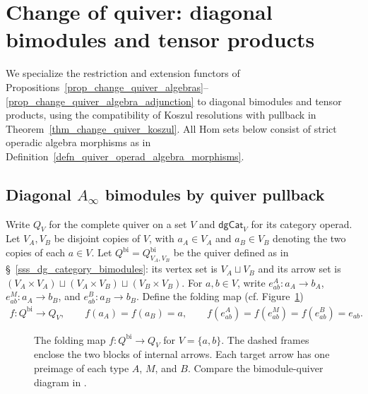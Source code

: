 \documentclass[11pt,letterpaper]{article}
\numberwithin{equation}{section}
\theoremstyle{plain}
\theoremstyle{definition}
\theoremstyle{remark}
\begin{document}
\section{Change of quiver: diagonal bimodules and tensor products}
\label{sss_diagonal_bimodule_pullback}
We specialize the restriction and extension functors of
Propositions~\ref{prop_change_quiver_algebras}--\ref{prop_change_quiver_algebra_adjunction}
to diagonal bimodules and tensor products, using the compatibility
of Koszul resolutions with pullback in
Theorem~\ref{thm_change_quiver_koszul}.
All Hom sets below consist of strict operadic algebra morphisms
as in Definition~\ref{defn_quiver_operad_algebra_morphisms}.

\subsection{Diagonal $A_\infty$ bimodules by quiver pullback}
\label{sss_diagonal_bimodule_construction}
Write $Q_V$ for the complete quiver on a set $V$ and
$\mathsf{dgCat}_V$ for its category operad. Let $V_A,V_B$ be
disjoint copies of $V$, with $a_A\in V_A$ and $a_B\in V_B$
denoting the two copies of each $a\in V$.
Let $Q^{\mathrm{bi}}=Q^{\mathrm{bi}}_{V_A,V_B}$ be the quiver
defined as in \S~\ref{sss_dg_category_bimodules}: its vertex
set is $V_A\sqcup V_B$ and its arrow set is
$(V_A\times V_A)\sqcup(V_A\times V_B)\sqcup(V_B\times V_B)$.
For $a,b\in V$, write
$ e^A_{ab}:a_A\to b_A$, $
 e^M_{ab}:a_A\to b_B$, and $
 e^B_{ab}:a_B\to b_B$.
Define the folding map (cf. Figure~\ref{fig:diagonal-quiver-folding})
\begin{equation}\label{eq_diagonal_quiver_folding}
\begin{gathered}
 f:Q^{\mathrm{bi}}\longrightarrow Q_V,
 \qquad f(a_A)=f(a_B)=a, \qquad 
 f(e^A_{ab})=f(e^M_{ab})=f(e^B_{ab})=e_{ab}.
\end{gathered}
\end{equation}

\begin{figure}[htbp]
\centering
\resizebox{\linewidth}{!}{}
\caption{The folding map $f:Q^{\mathrm{bi}}\to Q_V$ for $V=\{a,b\}$.
The dashed frames enclose the two blocks of internal arrows.
Each target arrow has one preimage of each type $A$, $M$, and $B$.
Compare the bimodule-quiver diagram in
\cite[\S~6.6, p.~45]{Yuan_higher_operad_Fuk}.}
\label{fig:diagonal-quiver-folding}
\end{figure}
\end{document}
